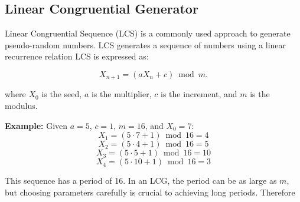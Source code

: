 	\subsection{Linear Congruential Generator}
	
	Linear Congruential Sequence (LCS) is a commonly used approach to generate
	pseudo-random numbers. LCS generates a sequence of numbers using a linear
	recurrence relation LCS is expressed as:

		$$X_{n+1} = (aX_n + c) \bmod m.$$

	where $X_0$ is the seed, $a$ is the multiplier, $c$ is the increment, and $m$ is the modulus.
	
	\textbf{Example:} Given $a = 5$, $c = 1$, $m = 16$, and $X_0 = 7$:
		$$X_1 = (5 \cdot 7 + 1)\bmod 16 = 4 $$
		$$X_2 = (5 \cdot 4 + 1) \bmod 16 = 5 $$
		$$X_3 = (5 \cdot 5 + 1) \bmod 16 = 10 $$
		$$X_4 = (5 \cdot 10 + 1) \bmod 16 = 3 $$

	
	This sequence has a period of 16. In an LCG, the period can be as large as $m$, but choosing parameters carefully is crucial to achieving long periods. Therefore
